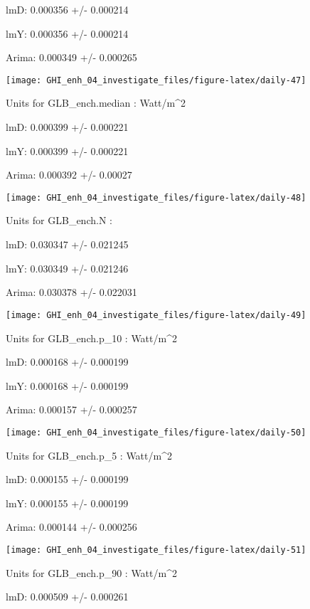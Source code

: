 \documentclass[
  10pt,
  a4paper,oneside]{article}
\begin{document}
lmD: 0.000356 +/- 0.000214

lmY: 0.000356 +/- 0.000214

Arima: 0.000349 +/- 0.000265

\begin{center}\texttt{[image: GHI\_enh\_04\_investigate\_files/figure-latex/daily-47]} \end{center}

Units for GLB\_ench.median : Watt/m\^{}2

lmD: 0.000399 +/- 0.000221

lmY: 0.000399 +/- 0.000221

Arima: 0.000392 +/- 0.00027

\begin{center}\texttt{[image: GHI\_enh\_04\_investigate\_files/figure-latex/daily-48]} \end{center}

Units for GLB\_ench.N :

lmD: 0.030347 +/- 0.021245

lmY: 0.030349 +/- 0.021246

Arima: 0.030378 +/- 0.022031

\begin{center}\texttt{[image: GHI\_enh\_04\_investigate\_files/figure-latex/daily-49]} \end{center}

Units for GLB\_ench.p\_10 : Watt/m\^{}2

lmD: 0.000168 +/- 0.000199

lmY: 0.000168 +/- 0.000199

Arima: 0.000157 +/- 0.000257

\begin{center}\texttt{[image: GHI\_enh\_04\_investigate\_files/figure-latex/daily-50]} \end{center}

Units for GLB\_ench.p\_5 : Watt/m\^{}2

lmD: 0.000155 +/- 0.000199

lmY: 0.000155 +/- 0.000199

Arima: 0.000144 +/- 0.000256

\begin{center}\texttt{[image: GHI\_enh\_04\_investigate\_files/figure-latex/daily-51]} \end{center}

Units for GLB\_ench.p\_90 : Watt/m\^{}2

lmD: 0.000509 +/- 0.000261
\end{document}
